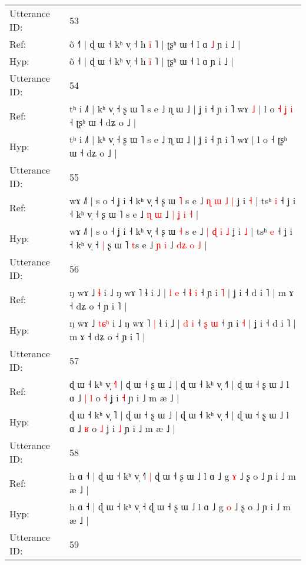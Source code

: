 \documentclass[10pt]{article}
\DeclareRobustCommand{\hl}[1]{{\textcolor{red}{#1}}}
\begin{document}
\begin{longtable}{ll}
 \\
\midrule
Utterance ID: & 53 \\
Ref: & õ ˧\hl{˥} | ɖ ɯ ˧ kʰ v̩ ˧ h \hl{}\hl{ĩ} ˥ | ʈʂʰ ɯ ˧ l ɑ\hl{ }\hl{˩} ɲ i ˩ |
 \\
Hyp: & õ ˧\hl{} | ɖ ɯ ˧ kʰ v̩ ˧ h \hl{i}\hl{̃} ˥ | ʈʂʰ ɯ ˧ l ɑ\hl{}\hl{} ɲ i ˩ |
 \\
\midrule
Utterance ID: & 54 \\
Ref: & tʰ i ˩˥ | kʰ v̩ ˧ ʂ ɯ ˥ s e ˩ ɳ ɯ ˩ | ʝ i ˧ ɲ i ˥ wɤ\hl{ }\hl{˩} | l o\hl{ }\hl{˧}\hl{ }\hl{ʝ}\hl{ }\hl{i} ˧ ʈʂʰ ɯ ˧ dʑ o ˩ |
 \\
Hyp: & tʰ i ˩˥ | kʰ v̩ ˧ ʂ ɯ ˥ s e ˩ ɳ ɯ ˩ | ʝ i ˧ ɲ i ˥ wɤ\hl{}\hl{} | l o\hl{}\hl{}\hl{}\hl{}\hl{}\hl{} ˧ ʈʂʰ ɯ ˧ dʑ o ˩ |
 \\
\midrule
Utterance ID: & 55 \\
Ref: & wɤ ˩˥ | s o ˧ ʝ i ˧ kʰ v̩ ˧ ʂ ɯ \hl{˥} s e ˩ \hl{ɳ} \hl{ɯ} \hl{˩} \hl{|} ʝ i \hl{˧} | tsʰ \hl{i} ˧ ʝ i ˧ kʰ v̩ ˧\hl{}\hl{} ʂ ɯ ˥ \hl{}s e ˩ \hl{ɳ} \hl{ɯ} ˩ \hl{|}\hl{ }\hl{ʝ} \hl{i} \hl{˧} |
 \\
Hyp: & wɤ ˩˥ | s o ˧ ʝ i ˧ kʰ v̩ ˧ ʂ ɯ \hl{˧} s e ˩ \hl{|} \hl{ɖ} \hl{i} \hl{˩} ʝ i \hl{˩} | tsʰ \hl{e} ˧ ʝ i ˧ kʰ v̩ ˧\hl{ }\hl{|} ʂ ɯ ˥ \hl{t}s e ˩ \hl{ɲ} \hl{i} ˩ \hl{}\hl{d}\hl{ʑ} \hl{o} \hl{˩} |
 \\
\midrule
Utterance ID: & 56 \\
Ref: & ŋ wɤ ˩ \hl{}\hl{}\hl{ɬ} i ˩ ŋ wɤ ˥\hl{}\hl{} ɬ i ˩ | \hl{l} \hl{e} ˧ \hl{ɬ} \hl{i} ˧ ɲ i \hl{˥} | ʝ i ˧ d i ˥ | m ɤ ˧ dʑ o ˧ ɲ i ˥ |
 \\
Hyp: & ŋ wɤ ˩ \hl{t}\hl{ɕ}\hl{ʰ} i ˩ ŋ wɤ ˥\hl{ }\hl{|} ɬ i ˩ | \hl{d} \hl{i} ˧ \hl{ʂ} \hl{ɯ} ˧ ɲ i \hl{˧} | ʝ i ˧ d i ˥ | m ɤ ˧ dʑ o ˧ ɲ i ˥ |
 \\
\midrule
Utterance ID: & 57 \\
Ref: & ɖ ɯ ˧ kʰ v̩ \hl{˧}˥ | ɖ ɯ ˧ ʂ ɯ ˩ | ɖ ɯ ˧ kʰ v̩ ˧\hl{˥} | ɖ ɯ ˧ ʂ ɯ ˩ l ɑ ˩\hl{ }\hl{|} \hl{l} o \hl{˧} ʝ i \hl{˧} ɲ i ˩ m æ ˩ |
 \\
Hyp: & ɖ ɯ ˧ kʰ v̩ \hl{}˥ | ɖ ɯ ˧ ʂ ɯ ˩ | ɖ ɯ ˧ kʰ v̩ ˧\hl{} | ɖ ɯ ˧ ʂ ɯ ˩ l ɑ ˩\hl{}\hl{} \hl{ʁ} o \hl{˩} ʝ i \hl{˩} ɲ i ˩ m æ ˩ |
 \\
\midrule
Utterance ID: & 58 \\
Ref: & h ɑ ˧ | ɖ ɯ ˧ kʰ v̩ ˧\hl{˥}\hl{ }\hl{|} ɖ ɯ ˧ ʂ ɯ ˩ l ɑ ˩ g \hl{ɤ} ˩ ʂ o ˩ ɲ i ˩ m æ ˩ |
 \\
Hyp: & h ɑ ˧ | ɖ ɯ ˧ kʰ v̩ ˧\hl{}\hl{}\hl{} ɖ ɯ ˧ ʂ ɯ ˩ l ɑ ˩ g \hl{o} ˩ ʂ o ˩ ɲ i ˩ m æ ˩ |
 \\
\midrule
Utterance ID: & 59 \\

\end{longtable}
\end{document}
